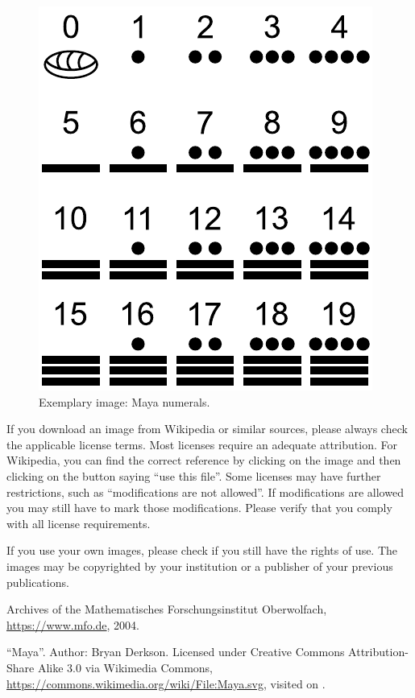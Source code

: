\documentclass{snapshotmfo}
\begin{document}
\begin{figure}[ht]
        \centering
        \includegraphics[width= 0.33 \textwidth]{maya.pdf}
        \caption{Exemplary image: Maya numerals.}
\label{fig.maya}
\end{figure}

If you download an image from Wikipedia or similar sources, please always check the applicable license terms. Most licenses require an adequate attribution. For Wikipedia, you can find the correct reference by clicking on the image and then clicking on the button saying ``use this file''. Some licenses may have further restrictions, such as ``modifications are not allowed''. If modifications are allowed you may still have to mark those modifications. Please verify that you comply with all license requirements.

If you use your own images, please check if you still have the rights of use. The images may be copyrighted by your institution or a publisher of your previous publications.


\begin{imagecredits}
  \item[\Cref{fig.sample-image}] Archives of the Mathematisches Forschungsinstitut Oberwolfach,\\\url{https://www.mfo.de}, 2004.
  \item[\Cref{fig.maya}] ``Maya''. Author: Bryan Derkson. Licensed under Creative Commons Attribution-Share Alike 3.0 via Wikimedia Commons, \url{https://commons.wikimedia.org/wiki/File:Maya.svg}, visited on .
\end{imagecredits}
\end{document}
